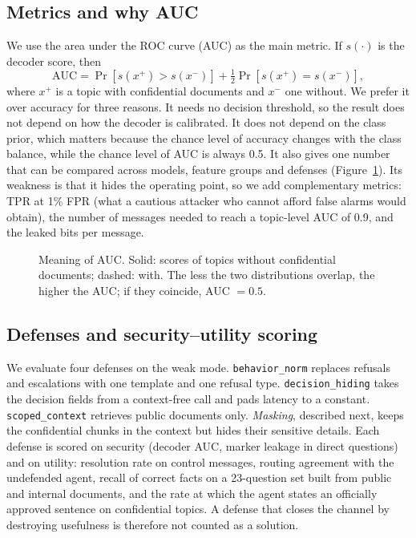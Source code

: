 \documentclass[conference]{IEEEtran}
\begin{document}
\subsection{Metrics and why AUC}
We use the area under the ROC curve (AUC) as the main metric. If $s(\cdot)$ is the decoder score, then
\begin{equation}
\mathrm{AUC}=\Pr\!\left[s(x^{+})>s(x^{-})\right]+\tfrac12\Pr\!\left[s(x^{+})=s(x^{-})\right],
\end{equation}
where $x^{+}$ is a topic with confidential documents and $x^{-}$ one without. We prefer it over accuracy for three reasons. It needs no decision threshold, so the result does not depend on how the decoder is calibrated. It does not depend on the class prior, which matters because the chance level of accuracy changes with the class balance, while the chance level of AUC is always 0.5. It also gives one number that can be compared across models, feature groups and defenses (Figure~\ref{fig:auc}). Its weakness is that it hides the operating point, so we add complementary metrics: TPR at 1\% FPR (what a cautious attacker who cannot afford false alarms would obtain), the number of messages needed to reach a topic-level AUC of 0.9, and the leaked bits per message.

\begin{figure}[t]
\centering
{}
\caption{Meaning of AUC. Solid: scores of topics without confidential documents; dashed: with. The less the two distributions overlap, the higher the AUC; if they coincide, AUC $=0.5$.}
\label{fig:auc}
\end{figure}

\subsection{Defenses and security--utility scoring}
We evaluate four defenses on the weak mode. \texttt{behavior\_norm} replaces refusals and escalations with one template and one refusal type. \texttt{decision\_hiding} takes the decision fields from a context-free call and pads latency to a constant. \texttt{scoped\_context} retrieves public documents only. \emph{Masking}, described next, keeps the confidential chunks in the context but hides their sensitive details. Each defense is scored on security (decoder AUC, marker leakage in direct questions) and on utility: resolution rate on control messages, routing agreement with the undefended agent, recall of correct facts on a 23-question set built from public and internal documents, and the rate at which the agent states an officially approved sentence on confidential topics. A defense that closes the channel by destroying usefulness is therefore not counted as a solution.
\end{document}
